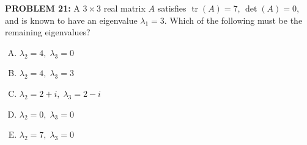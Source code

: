 \documentclass[12pt]{amsart}
\begin{document}
{\bf PROBLEM 21:}
%
A $3 \times 3$ real matrix $A$ satisfies $\operatorname{tr}(A) = 7$, $\det(A) = 0$, and is known to have an eigenvalue $\lambda_1 = 3$.
%
Which of the following must be the remaining eigenvalues?

\begin{enumerate}[(A)]
\item $\lambda_2 = 4, \; \lambda_3 = 0$
\item $\lambda_2 = 4, \; \lambda_3 = 3$
\item $\lambda_2 = 2+i, \; \lambda_3 = 2-i$
\item $\lambda_2 = 0, \; \lambda_3 = 0$
\item $\lambda_2 = 7, \; \lambda_3 = 0$
\end{enumerate}

%
%
%
%
 
\end{document}
